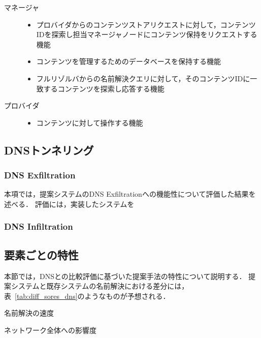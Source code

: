\begin{description}
 \item[マネージャ]\mbox{}
  \begin{itemize}
   \item プロバイダからのコンテンツストアリクエストに対して，コンテンツIDを探索し担当マネージャノードにコンテンツ保持をリクエストする機能
   \item コンテンツを管理するためのデータベースを保持する機能
   \item フルリゾルバからの名前解決クエリに対して，そのコンテンツIDに一致するコンテンツを探索し応答する機能
  \end{itemize}
 \item [プロバイダ]\mbox{}
  \begin{itemize}
   \item コンテンツに対して操作する機能
  \end{itemize}
\end{description}

\subsection{DNSトンネリング}
\subsubsection{DNS Exfiltration}
本項では，提案システムのDNS Exfiltrationへの機能性について評価した結果を述べる．
評価には，実装したシステムを
\subsubsection{DNS Infiltration}


\subsection{要素ごとの特性}
本節では，DNSとの比較評価に基づいた提案手法の特性について説明する．
提案システムと既存システムの名前解決における差分には，表~\ref{tab:diff_sores_dns}のようなものが予想される．



\begin{description}
 \setlength{\itemsep}{0pt}
 \setlength{\leftskip}{1.0cm}
 \item[RTT:] 名前解決の速度
 \item[トラフィック量:] ネットワーク全体への影響度
\end{description}

